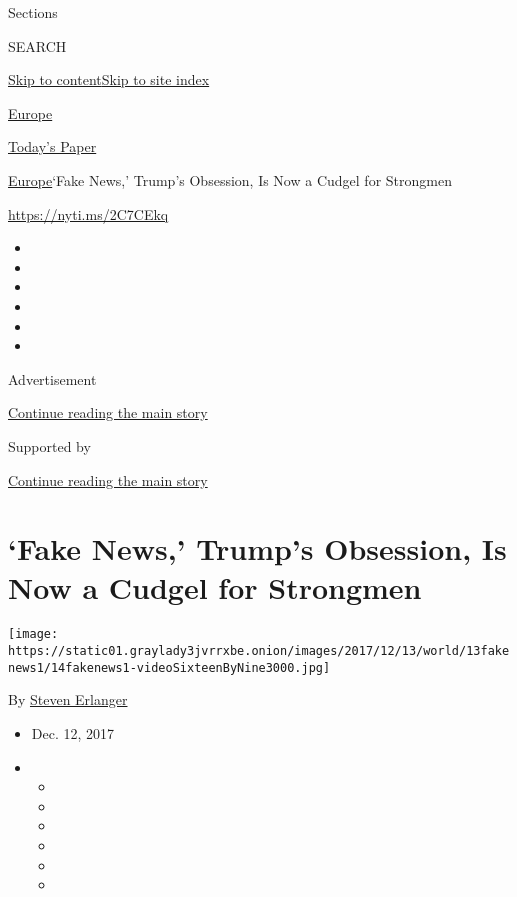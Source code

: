 Sections

SEARCH

\protect\hyperlink{site-content}{Skip to
content}\protect\hyperlink{site-index}{Skip to site index}

\href{https://www.nytimes3xbfgragh.onion/section/world/europe}{Europe}

\href{https://myaccount.nytimes3xbfgragh.onion/auth/login?response_type=cookie\&client_id=vi}{}

\href{https://www.nytimes3xbfgragh.onion/section/todayspaper}{Today's
Paper}

\href{/section/world/europe}{Europe}\textbar{}`Fake News,' Trump's
Obsession, Is Now a Cudgel for Strongmen

\url{https://nyti.ms/2C7CEkq}

\begin{itemize}
\item
\item
\item
\item
\item
\item
\end{itemize}

Advertisement

\protect\hyperlink{after-top}{Continue reading the main story}

Supported by

\protect\hyperlink{after-sponsor}{Continue reading the main story}

\hypertarget{fake-news-trumps-obsession-is-now-a-cudgel-for-strongmen}{%
\section{`Fake News,' Trump's Obsession, Is Now a Cudgel for
Strongmen}\label{fake-news-trumps-obsession-is-now-a-cudgel-for-strongmen}}

\texttt{[image: https://static01.graylady3jvrrxbe.onion/images/2017/12/13/world/13fakenews1/14fakenews1-videoSixteenByNine3000.jpg]}

By \href{http://www.nytimes3xbfgragh.onion/by/steven-erlanger}{Steven
Erlanger}

\begin{itemize}
\item
  Dec. 12, 2017
\item
  \begin{itemize}
  \item
  \item
  \item
  \item
  \item
  \item
  \end{itemize}
\end{itemize}

